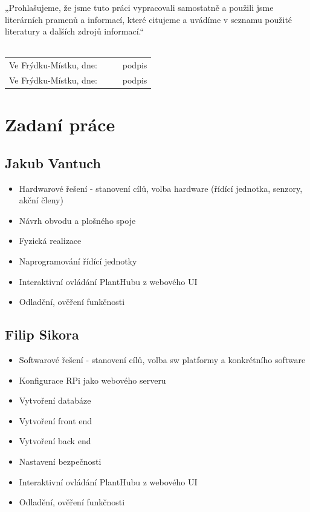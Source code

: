 \documentclass[czech,12pt,a4paper]{article}
\begin{document}
„Prohlašujeme, že jsme tuto práci vypracovali samostatně a použili jsme literárních pramenů a informací, které citujeme a uvádíme v seznamu použité literatury a dalších zdrojů informací.“ \\
\vspace*{0.5cm} \\
\renewcommand{\arraystretch}{2}
\begin{tabularx}{\textwidth}{l@{\hskip 0.75cm}X@{\hskip 1.5cm}X@{\hskip 0.75cm}l}
	Ve Frýdku-Místku, dne: & \dotfill & \dotfill & podpis \\
	Ve Frýdku-Místku, dne: & \dotfill & \dotfill & podpis \\
\end{tabularx}

\clearpage

\section*{Zadaní práce}

\subsection*{Jakub Vantuch}

\begin{itemize}
	\item Hardwarové řešení - stanovení cílů, volba hardware (řídící jednotka, senzory, akční členy)  
	\item Návrh obvodu a plošného spoje
	\item Fyzická realizace
	\item Naprogramování řídící jednotky
	\item Interaktivní ovládání PlantHubu z webového UI
	\item Odladění, ověření funkčnosti
\end{itemize}

\subsection*{Filip Sikora}

\begin{itemize}
	\item Softwarové řešení - stanovení cílů, volba sw platformy a konkrétního software  
	\item Konfigurace RPi jako webového serveru
	\item Vytvoření databáze
	\item Vytvoření front end
	\item Vytvoření back end
	\item Nastavení bezpečnosti
	\item Interaktivní ovládání PlantHubu z webového UI
	\item Odladění, ověření funkčnosti
\end{itemize}
\end{document}

